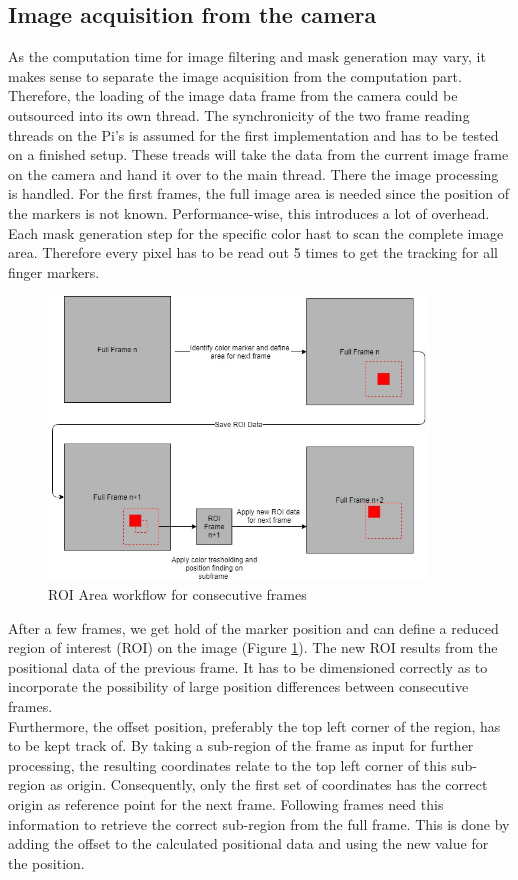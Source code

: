\subsection{Image acquisition from the camera}
As the computation time for image filtering and mask generation may vary, it makes sense to separate the image acquisition from the computation part. Therefore, the loading of the image data frame from the camera could be outsourced into its own thread. The synchronicity of the two frame reading threads on the Pi's is assumed for the first implementation and has to be tested on a finished setup. These treads will take the data from the current image frame on the camera and hand it over to the main thread. There the image processing is handled. For the first frames, the full image area is needed since the position of the markers is not known. Performance-wise, this introduces a lot of overhead. Each mask generation step for the specific color hast to scan  the complete image area. Therefore every pixel has to be read out 5 times to get the tracking for all finger markers.
\begin{figure}[H]
\centering
\includegraphics[width=0.9\textwidth]{images/ROI.jpg}
\caption{ROI Area workflow for consecutive frames}
\label{roi_calc} 
\end{figure}
After a few frames, we get hold of the marker position and can define a reduced region of interest (ROI) on the image (Figure \ref{roi_calc}). The new ROI results from the positional data of the previous frame. It has to be dimensioned correctly as to incorporate the possibility of large position differences between consecutive frames.
\\Furthermore, the offset position, preferably the top left corner of the region, has to be kept track of. By taking a sub-region of the frame as input for further processing, the resulting coordinates relate to the top left corner of this sub-region as origin. Consequently, only the first set of coordinates has the correct origin as reference point for the next frame. Following frames need this information to retrieve the correct sub-region from the full frame. This is done by adding the offset to the calculated positional data and using the new value for the position.\\
